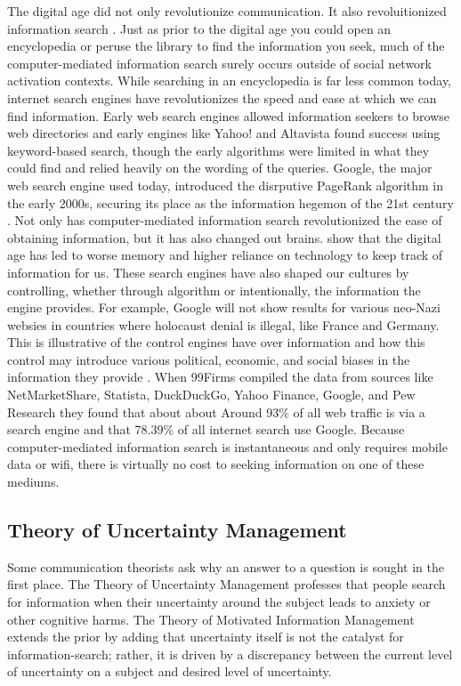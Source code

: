The digital age did not only revolutionize communication. It also
revoluitionized information search \citep{ramirez2002information}. Just as prior
to the digital age you could open an encyclopedia or peruse the library to find
the information you seek, much of the computer-mediated information search
surely occurs outside of social network activation contexts. While searching in
an encyclopedia is far less common today, internet search engines have
revolutionizes the speed and ease at which we can find information. Early web
search engines allowed information seekers to browse web directories and early
engines like Yahoo! and Altavista found success using keyword-based search,
though the early algorithms were limited in what they could find and relied
heavily on the wording of the queries. Google, the major web search engine used
today, introduced the disrputive PageRank algorithm in the early 2000s, securing
its place as the information hegemon of the 21st century
\citep{brin1998anatomy}. Not only has computer-mediated information search
revolutionized the ease of obtaining information, but it has also changed out
brains. \citet{sparrow2011google} show that the digital age has led to worse
memory and higher reliance on technology to keep track of information for us.
These search engines have also shaped our cultures by controlling, whether
through algorithm or intentionally, the information the engine provides. For
example, Google will not show results for various neo-Nazi websies in countries
where holocaust denial is illegal, like France and Germany. This is illustrative
of the control engines have over information and how this control may introduce
various political, economic, and social biases in the information they provide
\citep{segev2010google}. When 99Firms \citeyearpar{99firms22} compiled the data
from sources like NetMarketShare, Statista, DuckDuckGo, Yahoo Finance, Google,
and Pew Research they found that about about Around 93\% of all web traffic is
via a search engine and that 78.39\% of all internet search use Google. Because
computer-mediated information search is instantaneous and only requires mobile
data or wifi, there is virtually no cost to seeking information on one of these
mediums.

\subsection{Theory of Uncertainty Management}

Some communication theorists ask why an answer to a question is sought in the
first place. The Theory of Uncertainty Management
\citep{brashersCommunicationUncertaintyManagement2001} professes that people
search for information when their uncertainty around the subject leads to
anxiety or other cognitive harms. The Theory of Motivated Information Management
\citep{afifiSeekingInformationSexual2006, afifiTheoryMotivatedInformation2004}
extends the prior by adding that uncertainty itself is not the catalyst for
information-search; rather, it is driven by a discrepancy between the current
level of uncertainty on a subject and desired level of uncertainty.

